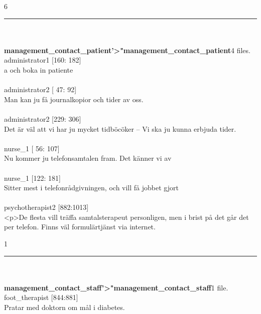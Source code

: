 \documentclass[12pt,a4paper,oneside]{article}
\begin{document}
6 
\hrule
\ \\\ \\{\bf management\_contact\_patient'>"management\_contact\_patient}4 files.
 administrator1 [160: 182]\\ 
a och boka in patiente %
\ \\\ \\
 administrator2 [ 47:  92]\\ 
Man kan ju f{\aa} journalkopior och tider av oss. %
\ \\\ \\
 administrator2 [229: 306]\\ 
Det {\"a}r v{\"a}l att vi har ju mycket tidb{\"o}c{\"o}ker -- Vi ska ju kunna erbjuda tider.  %
\ \\\ \\
 nurse\_1 [ 56: 107]\\ 
Nu kommer ju telefonsamtalen fram. Det k{\"a}nner vi av %
\ \\\ \\
 nurse\_1 [122: 181]\\ 
Sitter mest i telefonr{\aa}dgivningen, och vill f{\aa} jobbet gjort %
\ \\\ \\
 psychotherapist2 [882:1013]\\ 
<p>De flesta vill tr{\"a}ffa samtalsterapeut personligen, men i brist p{\aa} det g{\aa}r det per telefon. Finns v{\"a}l formul{\"a}rtj{\"a}nst via internet.  %

1 
\hrule
\ \\\ \\{\bf management\_contact\_staff'>"management\_contact\_staff}1 file.
 foot\_therapist [844:881]\\ 
Pratar med doktorn om m{\aa}l i diabetes. %
\end{document}
